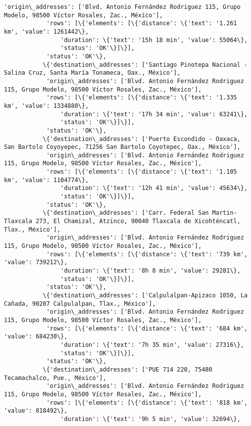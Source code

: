 \documentclass[11pt]{article}
\begin{document}
\begin{Verbatim}[commandchars=\\\{\}]
            'origin\_addresses': ['Blvd. Antonio Fernández Rodriguez 115, Grupo Modelo, 98500 Víctor Rosales, Zac., México'],
            'rows': [\{'elements': [\{'distance': \{'text': '1.261 km', 'value': 1261442\},
                'duration': \{'text': '15h 18 min', 'value': 55064\},
                'status': 'OK'\}]\}],
            'status': 'OK'\},
           \{'destination\_addresses': ['Santiago Pinotepa Nacional - Salina Cruz, Santa María Tonameca, Oax., México'],
            'origin\_addresses': ['Blvd. Antonio Fernández Rodriguez 115, Grupo Modelo, 98500 Víctor Rosales, Zac., México'],
            'rows': [\{'elements': [\{'distance': \{'text': '1.335 km', 'value': 1334880\},
                'duration': \{'text': '17h 34 min', 'value': 63241\},
                'status': 'OK'\}]\}],
            'status': 'OK'\},
           \{'destination\_addresses': ['Puerto Escondido - Oaxaca, San Bartolo Coyoyepec, 71256 San Bartolo Coyotepec, Oax., México'],
            'origin\_addresses': ['Blvd. Antonio Fernández Rodriguez 115, Grupo Modelo, 98500 Víctor Rosales, Zac., México'],
            'rows': [\{'elements': [\{'distance': \{'text': '1.105 km', 'value': 1104774\},
                'duration': \{'text': '12h 41 min', 'value': 45634\},
                'status': 'OK'\}]\}],
            'status': 'OK'\},
           \{'destination\_addresses': ['Carr. Federal San Martin-Tlaxcala 273, El Chamizal, Atzinco, 90040 Tlaxcala de Xicohténcatl, Tlax., México'],
            'origin\_addresses': ['Blvd. Antonio Fernández Rodriguez 115, Grupo Modelo, 98500 Víctor Rosales, Zac., México'],
            'rows': [\{'elements': [\{'distance': \{'text': '739 km', 'value': 739212\},
                'duration': \{'text': '8h 8 min', 'value': 29281\},
                'status': 'OK'\}]\}],
            'status': 'OK'\},
           \{'destination\_addresses': ['Calpulalpan-Apizaco 1050, La Cañada, 90207 Calpulalpan, Tlax., México'],
            'origin\_addresses': ['Blvd. Antonio Fernández Rodriguez 115, Grupo Modelo, 98500 Víctor Rosales, Zac., México'],
            'rows': [\{'elements': [\{'distance': \{'text': '684 km', 'value': 684230\},
                'duration': \{'text': '7h 35 min', 'value': 27316\},
                'status': 'OK'\}]\}],
            'status': 'OK'\},
           \{'destination\_addresses': ['PUE 714 220, 75480 Tecamachalco, Pue., México'],
            'origin\_addresses': ['Blvd. Antonio Fernández Rodriguez 115, Grupo Modelo, 98500 Víctor Rosales, Zac., México'],
            'rows': [\{'elements': [\{'distance': \{'text': '818 km', 'value': 818492\},
                'duration': \{'text': '9h 5 min', 'value': 32694\},

\end{Verbatim}
\end{document}

